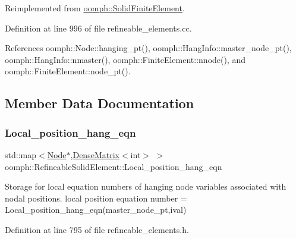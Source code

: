Reimplemented from \hyperlink{classoomph_1_1SolidFiniteElement_a73f387da7f31f233b79c2526e8cbc896}{oomph\+::\+Solid\+Finite\+Element}.



Definition at line 996 of file refineable\+\_\+elements.\+cc.



References oomph\+::\+Node\+::hanging\+\_\+pt(), oomph\+::\+Hang\+Info\+::master\+\_\+node\+\_\+pt(), oomph\+::\+Hang\+Info\+::nmaster(), oomph\+::\+Finite\+Element\+::nnode(), and oomph\+::\+Finite\+Element\+::node\+\_\+pt().



\subsection{Member Data Documentation}
\mbox{\label{classoomph_1_1RefineableSolidElement_ac12e9c9ea5a0f1f87cadaaec9d7d8fe9}} 
\subsubsection{\texorpdfstring{Local\+\_\+position\+\_\+hang\+\_\+eqn}{Local\_position\_hang\_eqn}}
{\footnotesize\ttfamily std\+::map$<$\hyperlink{classoomph_1_1Node}{Node}$\ast$,\hyperlink{classoomph_1_1DenseMatrix}{Dense\+Matrix}$<$int$>$ $>$ oomph\+::\+Refineable\+Solid\+Element\+::\+Local\+\_\+position\+\_\+hang\+\_\+eqn\hspace{0.3cm}{\ttfamily [private]}}



Storage for local equation numbers of hanging node variables associated with nodal positions. local position equation number = Local\+\_\+position\+\_\+hang\+\_\+eqn(master\+\_\+node\+\_\+pt,ival) 



Definition at line 795 of file refineable\+\_\+elements.\+h.

\mbox{\label{classoomph_1_1RefineableSolidElement_a7a398d47d3eaf9af809821d806b65973}} 
